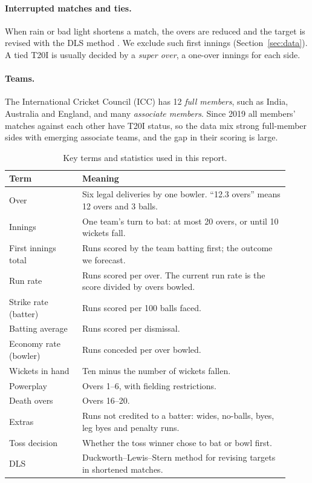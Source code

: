 \documentclass{article}
\newcommand{\1}{\mathbf{1}}
\begin{document}
\paragraph{Interrupted matches and ties.} When rain or bad light shortens a match, the overs are reduced and the target is revised with the DLS method \citep{duckworth1998,stern2016}. We exclude such first innings (Section~\ref{sec:data}). A tied T20I is usually decided by a \emph{super over}, a one-over innings for each side.

\paragraph{Teams.} The International Cricket Council (ICC) has 12 \emph{full members}, such as India, Australia and England, and many \emph{associate members}. Since 2019 all members' matches against each other have T20I status, so the data mix strong full-member sides with emerging associate teams, and the gap in their scoring is large.

\begin{table}[H]
\centering
\caption{Key terms and statistics used in this report.}
\label{tab:glossary}
\small
\begin{tabular}{>{\raggedright\arraybackslash}p{0.24\linewidth}>{\raggedright\arraybackslash}p{0.68\linewidth}}
\toprule
Term & Meaning \\
\midrule
Over & Six legal deliveries by one bowler. ``12.3 overs'' means 12 overs and 3 balls. \\
Innings & One team's turn to bat: at most 20 overs, or until 10 wickets fall. \\
First innings total & Runs scored by the team batting first; the outcome we forecast. \\
Run rate & Runs scored per over. The current run rate is the score divided by overs bowled. \\
Strike rate (batter) & Runs scored per 100 balls faced. \\
Batting average & Runs scored per dismissal. \\
Economy rate (bowler) & Runs conceded per over bowled. \\
Wickets in hand & Ten minus the number of wickets fallen. \\
Powerplay & Overs 1--6, with fielding restrictions. \\
Death overs & Overs 16--20. \\
Extras & Runs not credited to a batter: wides, no-balls, byes, leg byes and penalty runs. \\
Toss decision & Whether the toss winner chose to bat or bowl first. \\
DLS & Duckworth--Lewis--Stern method for revising targets in shortened matches. \\
\bottomrule
\end{tabular}
\end{table}
\end{document}
